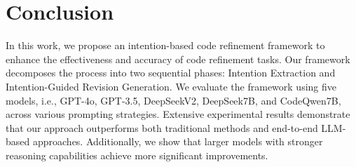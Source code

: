 \section{Conclusion}
In this work, we propose an intention-based code refinement framework to enhance the effectiveness and accuracy of code refinement tasks. Our framework decomposes the process into two sequential phases: Intention Extraction and Intention-Guided Revision Generation. We evaluate the framework using five models, i.e., GPT-4o, GPT-3.5, DeepSeekV2, DeepSeek7B, and CodeQwen7B, across various prompting strategies. Extensive experimental results demonstrate that our approach outperforms both traditional methods and end-to-end LLM-based approaches. Additionally, we show that larger models with stronger reasoning capabilities achieve more significant improvements.